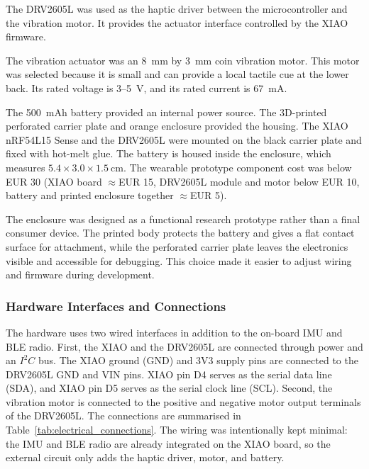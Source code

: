 The DRV2605L was used as the haptic driver between the microcontroller and the vibration motor. It provides the actuator interface controlled by the XIAO firmware.

The vibration actuator was an 8~mm by 3~mm coin vibration motor. This motor was selected because it is small and can provide a local tactile cue at the lower back. Its rated voltage is 3--5~V, and its rated current is 67~mA.

The 500~mAh battery provided an internal power source. The 3D-printed perforated carrier plate and orange enclosure provided the housing. The XIAO nRF54L15 Sense and the DRV2605L were mounted on the black carrier plate and fixed with hot-melt glue. The battery is housed inside the enclosure, which measures \(5.4 \times 3.0 \times 1.5~\mathrm{cm}\). The wearable prototype component cost was below EUR 30 (XIAO board $\approx$EUR 15, DRV2605L module and motor below EUR 10, battery and printed enclosure together $\approx$EUR 5).

The enclosure was designed as a functional research prototype rather than a final consumer device. The printed body protects the battery and gives a flat contact surface for attachment, while the perforated carrier plate leaves the electronics visible and accessible for debugging. This choice made it easier to adjust wiring and firmware during development.

\subsubsection{Hardware Interfaces and Connections}

The hardware uses two wired interfaces in addition to the on-board IMU and BLE radio. First, the XIAO and the DRV2605L are connected through power and an \(I^2C\) bus. The XIAO ground (GND) and 3V3 supply pins are connected to the DRV2605L GND and VIN pins. XIAO pin D4 serves as the serial data line (SDA), and XIAO pin D5 serves as the serial clock line (SCL). Second, the vibration motor is connected to the positive and negative motor output terminals of the DRV2605L. The connections are summarised in Table~\ref{tab:electrical_connections}. The wiring was intentionally kept minimal: the IMU and BLE radio are already integrated on the XIAO board, so the external circuit only adds the haptic driver, motor, and battery.

